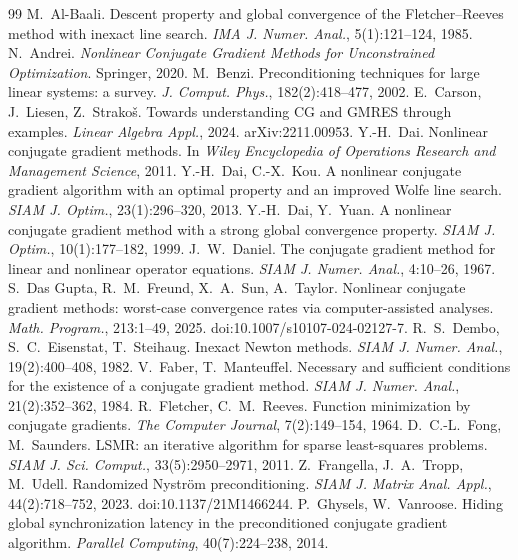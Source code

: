 \documentclass[11pt,a4paper]{article}
\theoremstyle{remark}
\begin{document}
\begin{thebibliography}{99}\small
{} M.~Al-Baali. Descent property and global convergence of the Fletcher--Reeves method with inexact line search. \emph{IMA J. Numer. Anal.}, 5(1):121--124, 1985.
 N.~Andrei. \emph{Nonlinear Conjugate Gradient Methods for Unconstrained Optimization}. Springer, 2020.
 M.~Benzi. Preconditioning techniques for large linear systems: a survey. \emph{J. Comput. Phys.}, 182(2):418--477, 2002.
 E.~Carson, J.~Liesen, Z.~Strako\v{s}. Towards understanding CG and GMRES through examples. \emph{Linear Algebra Appl.}, 2024. arXiv:2211.00953.
 Y.-H.~Dai. Nonlinear conjugate gradient methods. In \emph{Wiley Encyclopedia of Operations Research and Management Science}, 2011.
 Y.-H.~Dai, C.-X.~Kou. A nonlinear conjugate gradient algorithm with an optimal property and an improved Wolfe line search. \emph{SIAM J. Optim.}, 23(1):296--320, 2013.
 Y.-H.~Dai, Y.~Yuan. A nonlinear conjugate gradient method with a strong global convergence property. \emph{SIAM J. Optim.}, 10(1):177--182, 1999.
 J.~W.~Daniel. The conjugate gradient method for linear and nonlinear operator equations. \emph{SIAM J. Numer. Anal.}, 4:10--26, 1967.
 S.~Das Gupta, R.~M.~Freund, X.~A.~Sun, A.~Taylor. Nonlinear conjugate gradient methods: worst-case convergence rates via computer-assisted analyses. \emph{Math. Program.}, 213:1--49, 2025. doi:10.1007/s10107-024-02127-7.
 R.~S.~Dembo, S.~C.~Eisenstat, T.~Steihaug. Inexact Newton methods. \emph{SIAM J. Numer. Anal.}, 19(2):400--408, 1982.
 V.~Faber, T.~Manteuffel. Necessary and sufficient conditions for the existence of a conjugate gradient method. \emph{SIAM J. Numer. Anal.}, 21(2):352--362, 1984.
 R.~Fletcher, C.~M.~Reeves. Function minimization by conjugate gradients. \emph{The Computer Journal}, 7(2):149--154, 1964.
 D.~C.-L.~Fong, M.~Saunders. LSMR: an iterative algorithm for sparse least-squares problems. \emph{SIAM J. Sci. Comput.}, 33(5):2950--2971, 2011.
 Z.~Frangella, J.~A.~Tropp, M.~Udell. Randomized Nystr\"om preconditioning. \emph{SIAM J. Matrix Anal. Appl.}, 44(2):718--752, 2023. doi:10.1137/21M1466244.
 P.~Ghysels, W.~Vanroose. Hiding global synchronization latency in the preconditioned conjugate gradient algorithm. \emph{Parallel Computing}, 40(7):224--238, 2014.

\end{thebibliography}
\end{document}
